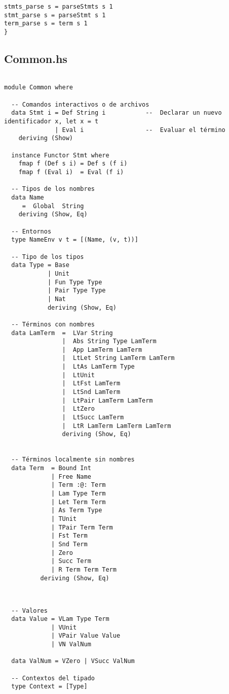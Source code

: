 \documentclass[a4paper]{report}
\begin{document}
\begin{lstlisting}
stmts_parse s = parseStmts s 1
stmt_parse s = parseStmt s 1
term_parse s = term s 1
}

\end{lstlisting}

\pagebreak
\subsection*{Common.hs}
\begin{lstlisting}

module Common where

  -- Comandos interactivos o de archivos
  data Stmt i = Def String i           --  Declarar un nuevo identificador x, let x = t
              | Eval i                 --  Evaluar el término
    deriving (Show)
  
  instance Functor Stmt where
    fmap f (Def s i) = Def s (f i)
    fmap f (Eval i)  = Eval (f i)

  -- Tipos de los nombres
  data Name
     =  Global  String
    deriving (Show, Eq)

  -- Entornos
  type NameEnv v t = [(Name, (v, t))]

  -- Tipo de los tipos
  data Type = Base 
            | Unit
            | Fun Type Type
            | Pair Type Type
            | Nat
            deriving (Show, Eq)
  
  -- Términos con nombres
  data LamTerm  =  LVar String
                |  Abs String Type LamTerm
                |  App LamTerm LamTerm
                |  LtLet String LamTerm LamTerm
                |  LtAs LamTerm Type
                |  LtUnit
                |  LtFst LamTerm
                |  LtSnd LamTerm
                |  LtPair LamTerm LamTerm
                |  LtZero
                |  LtSucc LamTerm
                |  LtR LamTerm LamTerm LamTerm
                deriving (Show, Eq)


  -- Términos localmente sin nombres
  data Term  = Bound Int
             | Free Name 
             | Term :@: Term
             | Lam Type Term
             | Let Term Term
             | As Term Type
             | TUnit
             | TPair Term Term
             | Fst Term
             | Snd Term
             | Zero
             | Succ Term
             | R Term Term Term
          deriving (Show, Eq)


\end{lstlisting}
\pagebreak
\begin{lstlisting}

  -- Valores
  data Value = VLam Type Term 
             | VUnit 
             | VPair Value Value
             | VN ValNum

  data ValNum = VZero | VSucc ValNum

  -- Contextos del tipado
  type Context = [Type]

\end{lstlisting}
\end{document}
